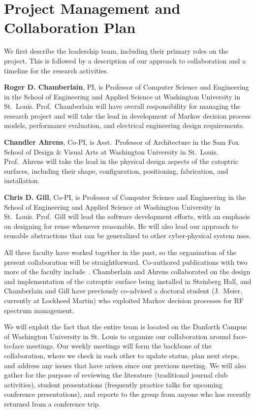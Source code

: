 \section{Project Management and Collaboration Plan}
\label{sec:collab}

We first describe the leadership team, including their primary roles
on the project.  This is followed by a description of our approach
to collaboration and a timeline for the research activities.

{\bf Roger D. Chamberlain}, PI, is Professor of Computer Science
and Engineering in the School of Engineering and Applied Science
at Washington University in St.~Louis.
Prof.~Chamberlain will have overall responsibility for managing the
research project and will take the lead in development of Markov
decision process models, performance evaluation, and electrical engineering
design requirements.

{\bf Chandler Ahrens}, Co-PI, is Asst.~Professor of Architecture
in the Sam Fox School of Design \& Visual Arts
at Washington University in St.~Louis.
Prof.~Ahrens will take the lead in the physical design aspects of
the catoptric surfaces, including their shape, configuration, positioning,
fabrication, and installation.

{\bf Chris D. Gill}, Co-PI, is Professor of Computer Science
and Engineering in the School of Engineering and Applied Science
at Washington University in St.~Louis.
Prof.~Gill will lead the software development efforts, with an emphasis
on designing for reuse whenever reasonable.  He will also lead our
approach to reusable abstractions that can be generalized to other
cyber-physical system uses.

All three faculty have worked together in the past, so the organization
of the present collaboration will be straightforward.  Co-authored
publications with two more of the faculty
include~\cite{cag18,mgc16, mskgct13}. Chamberlain and Ahrens collaborated
on the design and implementation of the catroptic surface being
installed in Steinberg Hall, and Chamberlain and Gill have previously
co-advised a doctoral student (J.~Meier, currently at Lockheed Martin)
who exploited Markov decision processes for RF spectrum management.

We will exploit the fact that the entire team is located on the
Danforth Campus of Washington University in St. Louis to organize
our collaboration around face-to-face meetings.  Our weekly meetings will
form the backbone of the collaboration, where we check in each other to
update status, plan next steps, and address any issues that have arisen
since our previous meeting.
We will also gather for the purpose of reviewing the literature
(traditional journal club activities), student presentations (frequently
practice talks for upcoming conference presentations), and reports
to the group from anyone who has recently returned from a conference trip.

